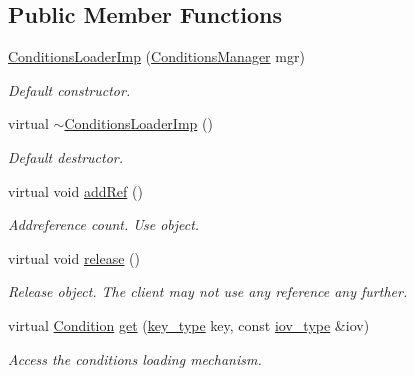 \subsection*{Public Member Functions}
\begin{DoxyCompactItemize}
\item 
\hyperlink{class_d_d4hep_1_1_conditions_1_1_conditions_loader_imp_a15a84941b8bf86ada6c80f0a0aaea082}{ConditionsLoaderImp} (\hyperlink{class_d_d4hep_1_1_conditions_1_1_conditions_manager}{ConditionsManager} mgr)
\begin{DoxyCompactList}\small\item\em Default constructor. \item\end{DoxyCompactList}\item 
virtual \hyperlink{class_d_d4hep_1_1_conditions_1_1_conditions_loader_imp_aff5e22b90011ae57c1ea4a5685ada304}{$\sim$ConditionsLoaderImp} ()
\begin{DoxyCompactList}\small\item\em Default destructor. \item\end{DoxyCompactList}\item 
virtual void \hyperlink{class_d_d4hep_1_1_conditions_1_1_conditions_loader_imp_a6302206e3ebcdf712425df5468598e2c}{addRef} ()
\begin{DoxyCompactList}\small\item\em Addreference count. Use object. \item\end{DoxyCompactList}\item 
virtual void \hyperlink{class_d_d4hep_1_1_conditions_1_1_conditions_loader_imp_a757ca1fe35b22abe5d4efde0fdc36396}{release} ()
\begin{DoxyCompactList}\small\item\em Release object. The client may not use any reference any further. \item\end{DoxyCompactList}\item 
virtual \hyperlink{class_d_d4hep_1_1_conditions_1_1_condition}{Condition} \hyperlink{class_d_d4hep_1_1_conditions_1_1_conditions_loader_imp_a0144aac3062bb704dd2c9557bed207da}{get} (\hyperlink{class_d_d4hep_1_1_conditions_1_1_conditions_loader_ac77fe60ee60373d61aed19b200949c93}{key\_\-type} key, const \hyperlink{class_d_d4hep_1_1_i_o_v}{iov\_\-type} \&iov)
\begin{DoxyCompactList}\small\item\em Access the conditions loading mechanism. \item\end{DoxyCompactList}\item 

\end{DoxyCompactItemize}
